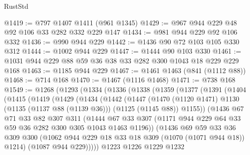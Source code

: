 \begin{lexlean}{RustStd}
\begin{coremodule}
@1419 := @797 @1407 @1411 (@961 @1345)
@1429 := @967 @944 @229 @48 @92 @106 @33 @282 @332 @229 @147
@1434 := @981 @944 @229 @92 @106 @332
@1436 := @990 @944 @229
@1442 := @1436 @90 @72 @103 @105 @330 @312
@1444 := @1002 @944 @229
@1447 := @1444 @90 @103 @330
@1461 := @1031 @944 @229 @88 @59 @36 @38 @33 @282 @300 @1043 @18 @229 @229 @168
@1463 := @1185 @944 @229
@1467 := @1461 @1463 (@841 (@1112 @88))
@1468 := @714 @168
@1470 := @1467 (@1116 @1468)
@1471 := @738 @168
@1549 := @1268
    (@1293
      (@1334
        (@1336
          (@1338
            (@1359
              (@1377
                (@1391
                  (@1404
                    (@1415
                      (@1419
                        (@1429
                          (@1434
                            (@1442
                              (@1447
                                (@1470
                                  (@1120 @1471)
                                  @1130
                                  (@1135 (@1137 @88 (@1139 @36)))
                                  (@1125 (@1145 @88))
                                  @1155))
                              (@1436
                                @67
                                @71
                                @33
                                @82
                                @307
                                @311
                                (@1444
                                  @67
                                  @33
                                  @307
                                  (@1171
                                    @944
                                    @229
                                    @64
                                    @33
                                    @59
                                    @36
                                    @282
                                    @300
                                    @305
                                    @1043
                                    @1463
                                    @1196))
                                (@1436
                                  @69
                                  @59
                                  @33
                                  @36
                                  @309
                                  @300
                                  (@1062 @944 @229 @18 @33 @18 @309 (@1070 (@1071 @944 @18)) @1214)
                                  (@1087 @944 @229)))))
                          @1223
                          @1226
                          @1229
                          @1232

\end{coremodule}
\end{lexlean}
